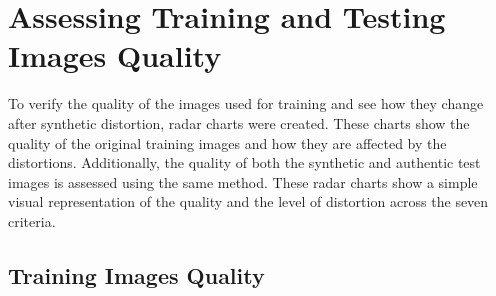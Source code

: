 \section{Assessing Training and Testing Images Quality}
\label{sec:TestingFilteredImages}
To verify the quality of the images used for training and see how they change after synthetic distortion, radar charts were created. These charts show the quality of the original training images and how they are affected by the distortions. Additionally, the quality of both the synthetic and authentic test images is assessed using the same method. These radar charts show a simple visual representation of the quality and the level of distortion across the seven criteria. \par
\subsection{Training Images Quality}
\label{subsec:TrainingImagesQuality}
